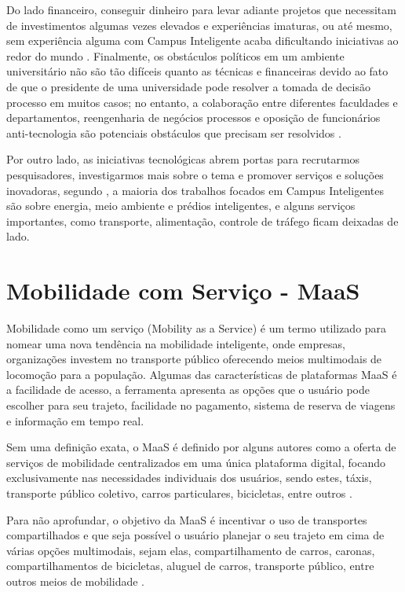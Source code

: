 Do lado financeiro, conseguir dinheiro para levar adiante projetos que necessitam de investimentos algumas vezes elevados e experiências imaturas, ou até mesmo, sem experiência alguma com Campus Inteligente acaba dificultando iniciativas ao redor do mundo . Finalmente, os obstáculos políticos em um ambiente universitário
não são tão difíceis quanto as técnicas e financeiras devido ao
fato de que o presidente de uma universidade pode resolver a tomada de decisão processo em muitos casos; no entanto, a colaboração entre
diferentes faculdades e departamentos, reengenharia de negócios
processos e oposição de funcionários anti-tecnologia são potenciais
obstáculos que precisam ser resolvidos \cite{alghamdi}.

Por outro lado, as iniciativas tecnológicas abrem portas para recrutarmos pesquisadores, investigarmos mais sobre o tema e promover serviços e soluções inovadoras, segundo \cite{alghamdi}, a maioria dos trabalhos focados em Campus Inteligentes são sobre energia, meio ambiente e prédios inteligentes, e alguns serviços importantes, como transporte, alimentação, controle de tráfego ficam deixadas de lado.

\section{Mobilidade com Serviço - MaaS}

Mobilidade como um serviço (Mobility as a Service) é um termo utilizado para nomear uma nova tendência na mobilidade inteligente, onde empresas, organizações investem no transporte público oferecendo meios multimodais de locomoção  para a população. Algumas das características de plataformas MaaS é a facilidade de acesso, a ferramenta apresenta as opções que o usuário pode escolher para seu trajeto, facilidade no pagamento, sistema de reserva de viagens e informação em tempo real.

Sem uma definição exata, o MaaS é definido por alguns autores como a oferta de serviços de mobilidade centralizados em uma única plataforma digital, focando exclusivamente nas necessidades individuais dos usuários, sendo estes, táxis, transporte público coletivo, carros particulares, bicicletas, entre outros \cite{jittrapirom, kamargianni, mulley}.

Para não aprofundar, o objetivo da MaaS é incentivar o uso de transportes compartilhados e que seja possível o usuário planejar o seu trajeto em cima de várias opções multimodais, sejam elas, compartilhamento de carros, caronas, compartilhamentos de bicicletas, aluguel de carros, transporte público, entre outros meios de mobilidade \cite{jittrapirom}. 

